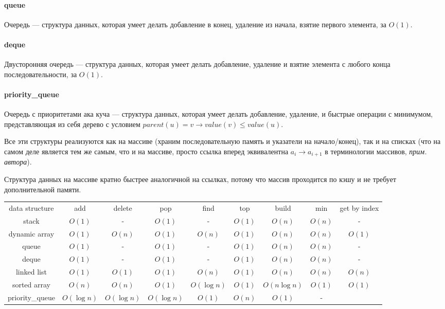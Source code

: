 \documentclass[12pt]{article}
\begin{document}
\paragraph{queue}
Очередь --- структура данных, которая умеет делать добавление в конец, удаление из начала, взятие первого элемента, за $O(1)$.

\paragraph{deque}
Двусторонняя очередь --- структура данных, которая умеет делать добавление, удаление и взятие элемента с любого конца последовательности, за $O(1)$.

\paragraph{priority\_queue}
Очередь с приоритетами ака куча --- структура данных, которая умеет делать добавление, удаление, и быстрые операции с минимумом, представляющая из себя дерево с условием $parent(u) = v \rightarrow value(v) \le value(u)$.


Все эти структуры реализуются как на массиве (храним последовательную память и указатели на начало/конец), так и на списках (что на самом деле является тем же самым, что и на массиве, просто ссылка вперед эквивалентна $a_i \rightarrow a_{i + 1}$ в терминологии массивов, \textit{прим. автора}).

Структура данных на массиве кратно быстрее аналогичной на ссылках, потому что массив проходится по кэшу и не требует дополнительной памяти.

\begin{center}
\begin{tabular}{c c c c c c c c c}
data structure & add & delete & pop & find & top & build & min & get by index\\
stack & $O(1)$ & - & $O(1)$ & - & $O(1)$ & $O(n)$ & $O(n)$ & -\\
dynamic array & $O(1)$ & $O(n)$ & $O(1)$ & $O(n)$ & $O(1)$ & $O(n)$ & $O(n)$ & $O(1)$ \\
queue & $O(1)$ & - & $O(1)$ & - & $O(1)$ & $O(n)$ & $O(n)$ & -\\
deque & $O(1)$ & - & $O(1)$ & - & $O(1)$ & $O(n)$ & $O(n)$ & -\\
linked list & $O(1)$ & $O(1)$ & $O(1)$ & $O(n)$ & $O(1)$ & $O(n)$ & $O(n)$ & $O(n)$\\
sorted array& $O(n)$ & $O(n)$ & $O(1)$ & $O(\log n)$ & $O(1)$ & $O(n \log n)$ & $O(1)$ & $O(1)$ \\
priority\_queue& $O(\log n)$ & $O(\log n)$ & $O(\log n)$ & $O(1)$ & $O(n)$ & $O(1)$ & -
\end{tabular}
\end{center}
\end{document}
